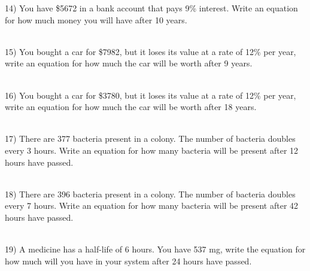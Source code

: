 \documentclass[12pt]{article}
\begin{document}
\hrulefill





14) You have \$5672 in a bank account that pays 9\% interest. Write an equation for how much money you will have after 10 years. \\ \\
 

\hrulefill







15) You bought a car for \$7982, but it loses its value at a rate of 12\% per year, write an equation for how much the car will be worth after 9 years. \\ \\
 

\hrulefill




16) You bought a car for \$3780, but it loses its value at a rate of 12\% per year, write an equation for how much the car will be worth after 18 years. \\ \\
 

\hrulefill







17) There are 377 bacteria present in a colony. The number of bacteria doubles every 3 hours. Write an equation for how many bacteria will be present after 12 hours have passed. \\ \\
 

\hrulefill





18) There are 396 bacteria present in a colony. The number of bacteria doubles every 7 hours. Write an equation for how many bacteria will be present after 42 hours have passed. \\ \\
 

\hrulefill






19) A medicine has a half-life of 6 hours. You have 537 mg, write the equation for how much will you have in your system after 24 hours have passed. \\ \\
 

\hrulefill
\end{document}
